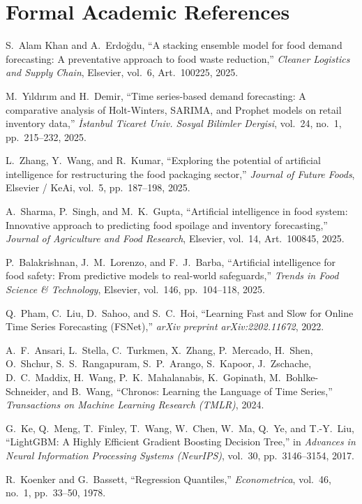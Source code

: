 \documentclass[11pt,a4paper,oneside]{report}
\begin{document}
\section{Formal Academic References}
\begin{enumerate}[label={[\arabic*]},leftmargin=*]
  \item S.~Alam Khan and A.~Erdo\u{g}du, ``A stacking ensemble model for food demand forecasting: A preventative approach to food waste reduction,'' \textit{Cleaner Logistics and Supply Chain}, Elsevier, vol.~6, Art.~100225, 2025.
  \item M.~Y{\i}ld{\i}r{\i}m and H.~Demir, ``Time series-based demand forecasting: A comparative analysis of Holt-Winters, SARIMA, and Prophet models on retail inventory data,'' \textit{\.Istanbul Ticaret Univ. Sosyal Bilimler Dergisi}, vol.~24, no.~1, pp.~215--232, 2025.
  \item L.~Zhang, Y.~Wang, and R.~Kumar, ``Exploring the potential of artificial intelligence for restructuring the food packaging sector,'' \textit{Journal of Future Foods}, Elsevier / KeAi, vol.~5, pp.~187--198, 2025.
  \item A.~Sharma, P.~Singh, and M.~K.~Gupta, ``Artificial intelligence in food system: Innovative approach to predicting food spoilage and inventory forecasting,'' \textit{Journal of Agriculture and Food Research}, Elsevier, vol.~14, Art.~100845, 2025.
  \item P.~Balakrishnan, J.~M.~Lorenzo, and F.~J.~Barba, ``Artificial intelligence for food safety: From predictive models to real-world safeguards,'' \textit{Trends in Food Science \& Technology}, Elsevier, vol.~146, pp.~104--118, 2025.
  \item Q.~Pham, C.~Liu, D.~Sahoo, and S.~C.~Hoi, ``Learning Fast and Slow for Online Time Series Forecasting (FSNet),'' \textit{arXiv preprint arXiv:2202.11672}, 2022.
  \item A.~F.~Ansari, L.~Stella, C.~Turkmen, X.~Zhang, P.~Mercado, H.~Shen, O.~Shchur, S.~S.~Rangapuram, S.~P.~Arango, S.~Kapoor, J.~Zschache, D.~C.~Maddix, H.~Wang, P.~K.~Mahalanabis, K.~Gopinath, M.~Bohlke-Schneider, and B.~Wang, ``Chronos: Learning the Language of Time Series,'' \textit{Transactions on Machine Learning Research (TMLR)}, 2024.
  \item G.~Ke, Q.~Meng, T.~Finley, T.~Wang, W.~Chen, W.~Ma, Q.~Ye, and T.-Y.~Liu, ``LightGBM: A Highly Efficient Gradient Boosting Decision Tree,'' in \textit{Advances in Neural Information Processing Systems (NeurIPS)}, vol.~30, pp.~3146--3154, 2017.
  \item R.~Koenker and G.~Bassett, ``Regression Quantiles,'' \textit{Econometrica}, vol.~46, no.~1, pp.~33--50, 1978.

\end{enumerate}
\end{document}
